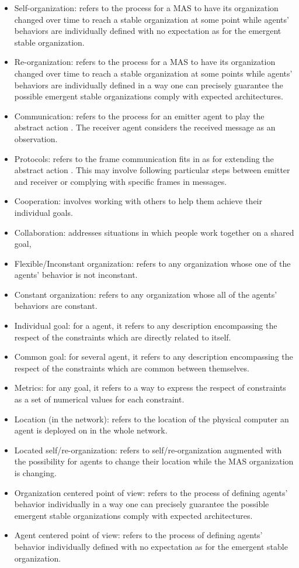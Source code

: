 \documentclass[conference]{IEEEtran}
\begin{document}
\begin{itemize}
    \item Self-organization: refers to the process for a MAS to have its organization changed over time to reach a stable organization at some point while agents' behaviors are individually defined with no expectation as for the emergent stable organization.
    \item Re-organization: refers to the process for a MAS to have its organization changed over time to reach a stable organization at some points while agents' behaviors are individually defined in a way one can precisely guarantee the possible emergent stable organizations comply with expected architectures. 
    \item Communication: refers to the process for an emitter agent to play the abstract action . The receiver agent considers the received message as an observation.
    \item Protocols: refers to the frame communication fits in as for extending the abstract action . This may involve following particular steps between emitter and receiver or complying with specific frames in messages. 
    \item Cooperation: involves working with others to help them achieve their individual goals.
    \item Collaboration: addresses situations in which people work together on a shared goal, 
    \item Flexible/Inconstant organization: refers to any organization whose one of the agents' behavior is not inconstant.
    \item Constant organization: refers to any organization whose all of the agents' behaviors are constant.
    \item Individual goal: for a agent, it refers to any description encompassing the respect of the constraints which are directly related to itself.
    \item Common goal: for several agent, it refers to any description encompassing the respect of the constraints which are common between themselves.
    \item Metrics: for any goal, it refers to a way to express the respect of constraints as a set of numerical values for each constraint.
    \item Location (in the network): refers to the location of the physical computer an agent is deployed on in the whole network.
    \item Located self/re-organization: refers to self/re-organization augmented with the possibility for agents to change their location while the MAS organization is changing.
    \item Organization centered point of view: refers to the process of defining agents' behavior individually in a way one can precisely guarantee the possible emergent stable organizations comply with expected architectures. 
    \item Agent centered point of view: refers to the process of defining agents' behavior individually defined with no expectation as for the emergent stable organization.
\end{itemize}
\end{document}
